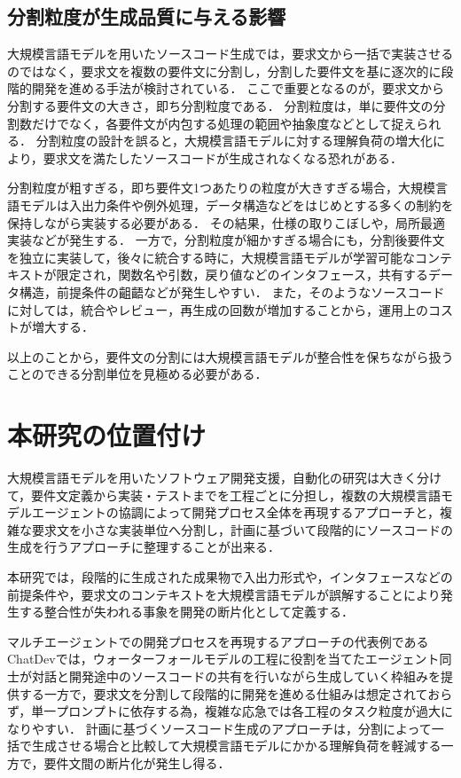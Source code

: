 \documentclass[11pt]{jreport}
\begin{document}
\subsection{分割粒度が生成品質に与える影響}
大規模言語モデルを用いたソースコード生成では，要求文から一括で実装させるのではなく，要求文を複数の要件文に分割し，分割した要件文を基に逐次的に段階的開発を進める手法が検討されている\cite{TOSEM}．
ここで重要となるのが，要求文から分割する要件文の大きさ，即ち分割粒度である．
分割粒度は，単に要件文の分割数だけでなく，各要件文が内包する処理の範囲や抽象度などとして捉えられる．
分割粒度の設計を誤ると，大規模言語モデルに対する理解負荷の増大化により，要求文を満たしたソースコードが生成されなくなる恐れがある．

分割粒度が粗すぎる，即ち要件文1つあたりの粒度が大きすぎる場合，大規模言語モデルは入出力条件や例外処理，データ構造などをはじめとする多くの制約を保持しながら実装する必要がある．
その結果，仕様の取りこぼしや，局所最適実装などが発生する．
一方で，分割粒度が細かすぎる場合にも，分割後要件文を独立に実装して，後々に統合する時に，大規模言語モデルが学習可能なコンテキストが限定され，関数名や引数，戻り値などのインタフェース，共有するデータ構造，前提条件の齟齬などが発生しやすい．
また，そのようなソースコードに対しては，統合やレビュー，再生成の回数が増加することから，運用上のコストが増大する．

以上のことから，要件文の分割には大規模言語モデルが整合性を保ちながら扱うことのできる分割単位を見極める必要がある．



\section{本研究の位置付け}

大規模言語モデルを用いたソフトウェア開発支援，自動化の研究は大きく分けて，要件文定義から実装・テストまでを工程ごとに分担し，複数の大規模言語モデルエージェントの協調によって開発プロセス全体を再現するアプローチと，複雑な要求文を小さな実装単位へ分割し，計画に基づいて段階的にソースコードの生成を行うアプローチに整理することが出来る．

本研究では，段階的に生成された成果物で入出力形式や，インタフェースなどの前提条件や，要求文のコンテキストを大規模言語モデルが誤解することにより発生する整合性が失われる事象を開発の断片化として定義する．

マルチエージェントでの開発プロセスを再現するアプローチの代表例であるChatDevでは，ウォーターフォールモデルの工程に役割を当てたエージェント同士が対話と開発途中のソースコードの共有を行いながら生成していく枠組みを提供する一方で，要求文を分割して段階的に開発を進める仕組みは想定されておらず，単一プロンプトに依存する為，複雑な応急では各工程のタスク粒度が過大になりやすい．
計画に基づくソースコード生成のアプローチは，分割によって一括で生成させる場合と比較して大規模言語モデルにかかる理解負荷を軽減する一方で，要件文間の断片化が発生し得る．
\end{document}
